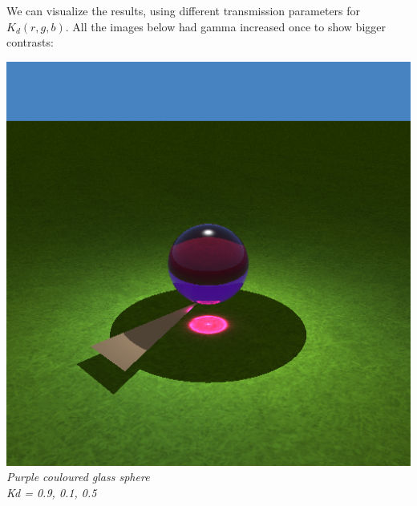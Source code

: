 \documentclass[a4,12pt]{article}
\begin{document}
	We can visualize the results, using different transmission parameters for $K_d(r, g, b)$. All the images below had gamma increased once to show bigger contrasts:
	
	\begin{center}
		\begin{minipage}[b]{0.40\linewidth}
			\begin{center}
				\includegraphics[width = \textwidth]{./Worksheet8/pinkball_c.png}\\
				\textit{Purple couloured glass sphere\\Kd = 0.9, 0.1, 0.5}\\
			\end{center}
		\end{minipage}
		\hspace{0.05\linewidth}
		\begin{minipage}[b]{0.40\linewidth}
			\begin{center}

\end{center}
\end{minipage}
\end{center}
\end{document}
